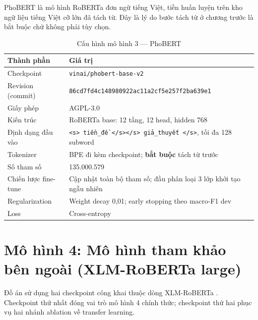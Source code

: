 \documentclass[12pt,a4paper,oneside]{report}
\begin{document}
PhoBERT là mô hình RoBERTa đơn ngữ tiếng Việt, tiền huấn luyện trên kho ngữ liệu tiếng
Việt cỡ lớn đã tách từ. Đây là lý do bước tách từ ở chương trước là bắt buộc chứ không phải
tùy chọn.

\begin{table}[H]
\centering
\caption{Cấu hình mô hình 3 --- PhoBERT}
\begin{tabularx}{\textwidth}{@{}L{4.5cm}Y@{}}
\toprule
\textbf{Thành phần} & \textbf{Giá trị} \\
\midrule
Checkpoint & \texttt{vinai/phobert-base-v2} \\
Revision (commit) & \texttt{86cd7fd4c148980922ac11a2cf5e257f2ba639e1} \\
Giấy phép & AGPL-3.0 \\
Kiến trúc & RoBERTa base: 12 tầng, 12 head, hidden 768 \\
Định dạng đầu vào & \texttt{<s> tiền\_đề </s></s> giả\_thuyết </s>}, tối đa 128 subword \\
Tokenizer & BPE đi kèm checkpoint; \textbf{bắt buộc} tách từ trước \\
Số tham số & 135.000.579 \\
Chiến lược fine-tune & Cập nhật toàn bộ tham số; đầu phân loại 3 lớp khởi tạo ngẫu nhiên \\
Regularization & Weight decay 0,01; early stopping theo macro-F1 dev \\
Loss & Cross-entropy \\
\bottomrule
\end{tabularx}
\end{table}

\section{Mô hình 4: Mô hình tham khảo bên ngoài (XLM-RoBERTa large)}

Đồ án sử dụng hai checkpoint công khai thuộc dòng XLM-RoBERTa \cite{xlmr}. Checkpoint thứ
nhất đóng vai trò mô hình 4 chính thức; checkpoint thứ hai phục vụ hai nhánh ablation về
transfer learning.
\end{document}
